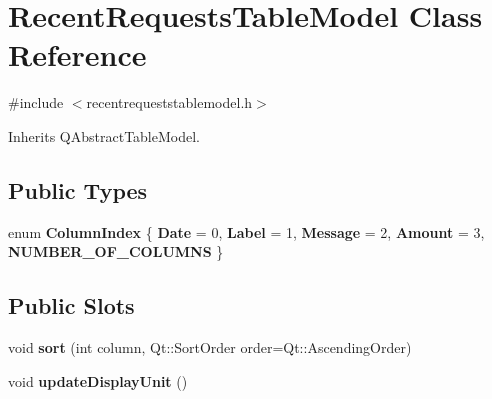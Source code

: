 \hypertarget{class_recent_requests_table_model}{}\section{Recent\+Requests\+Table\+Model Class Reference}
\label{class_recent_requests_table_model}


{\ttfamily \#include $<$recentrequeststablemodel.\+h$>$}



Inherits Q\+Abstract\+Table\+Model.

\subsection*{Public Types}
\begin{DoxyCompactItemize}
\item 
\mbox{\label{class_recent_requests_table_model_a720ff50ef9f8e016a5d2bbd8fd7fb41d}} 
enum {\bfseries Column\+Index} \{ \newline
{\bfseries Date} = 0, 
{\bfseries Label} = 1, 
{\bfseries Message} = 2, 
{\bfseries Amount} = 3, 
\newline
{\bfseries N\+U\+M\+B\+E\+R\+\_\+\+O\+F\+\_\+\+C\+O\+L\+U\+M\+NS}
 \}
\end{DoxyCompactItemize}
\subsection*{Public Slots}
\begin{DoxyCompactItemize}
\item 
\mbox{\label{class_recent_requests_table_model_a63ba78741b7115af25908f88d138c201}} 
void {\bfseries sort} (int column, Qt\+::\+Sort\+Order order=Qt\+::\+Ascending\+Order)
\item 
\mbox{\label{class_recent_requests_table_model_a8c4fe82f628df4e3a46809514ba9fe03}} 
void {\bfseries update\+Display\+Unit} ()
\end{DoxyCompactItemize}
